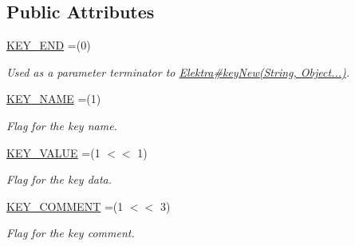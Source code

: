 \subsection*{Public Attributes}
\begin{DoxyCompactItemize}
\item 
\mbox{\label{enumorg_1_1libelektra_1_1Elektra_1_1KeyNewArgumentFlags_a284d90f457be9489b0a52eb55f0977ab}} 
\hyperlink{enumorg_1_1libelektra_1_1Elektra_1_1KeyNewArgumentFlags_a284d90f457be9489b0a52eb55f0977ab}{K\+E\+Y\+\_\+\+E\+ND} =(0)
\begin{DoxyCompactList}\small\item\em Used as a parameter terminator to \hyperlink{}{Elektra\#key\+New(\+String, Object...)}. \end{DoxyCompactList}\item 
\mbox{\label{enumorg_1_1libelektra_1_1Elektra_1_1KeyNewArgumentFlags_a4593b6a3aa438fd11a00a0eab93e66b8}} 
\hyperlink{enumorg_1_1libelektra_1_1Elektra_1_1KeyNewArgumentFlags_a4593b6a3aa438fd11a00a0eab93e66b8}{K\+E\+Y\+\_\+\+N\+A\+ME} =(1)
\begin{DoxyCompactList}\small\item\em Flag for the key name. \end{DoxyCompactList}\item 
\mbox{\label{enumorg_1_1libelektra_1_1Elektra_1_1KeyNewArgumentFlags_af2a71635dab3ce6d301d102e4bf8fef2}} 
\hyperlink{enumorg_1_1libelektra_1_1Elektra_1_1KeyNewArgumentFlags_af2a71635dab3ce6d301d102e4bf8fef2}{K\+E\+Y\+\_\+\+V\+A\+L\+UE} =(1 $<$$<$ 1)
\begin{DoxyCompactList}\small\item\em Flag for the key data. \end{DoxyCompactList}\item 
\mbox{\label{enumorg_1_1libelektra_1_1Elektra_1_1KeyNewArgumentFlags_acfb348a7cdae901b0819eedb57bfca24}} 
\hyperlink{enumorg_1_1libelektra_1_1Elektra_1_1KeyNewArgumentFlags_acfb348a7cdae901b0819eedb57bfca24}{K\+E\+Y\+\_\+\+C\+O\+M\+M\+E\+NT} =(1 $<$$<$ 3)
\begin{DoxyCompactList}\small\item\em Flag for the key comment. \end{DoxyCompactList}\item 

\end{DoxyCompactItemize}
